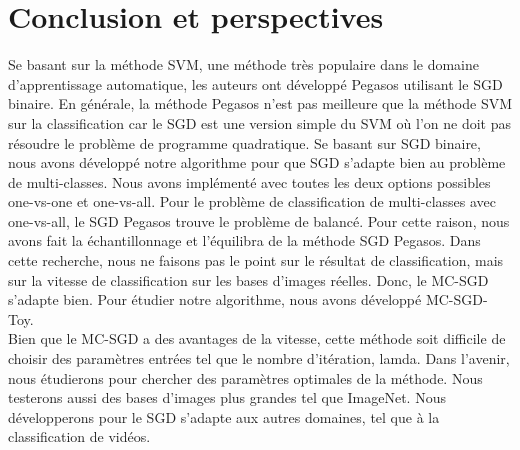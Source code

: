 \chapter*{Conclusion et perspectives}
\label{chap:con}
Se basant sur la méthode SVM, une méthode très populaire dans le domaine d'apprentissage automatique, les auteurs ont développé Pegasos \cite{sss07} utilisant le SGD binaire. En générale, la méthode Pegasos n'est pas meilleure que la méthode SVM sur la classification car le SGD est une version simple du SVM où l'on ne doit pas résoudre le problème de programme quadratique. Se basant sur SGD binaire, nous avons développé notre algorithme pour que SGD s'adapte bien au problème de multi-classes. Nous avons implémenté avec toutes les deux options possibles one-vs-one et one-vs-all. Pour le problème de classification de multi-classes avec one-vs-all, le SGD Pegasos trouve le problème de balancé. Pour cette raison, nous avons fait la échantillonnage et l'équilibra de la méthode SGD Pegasos. Dans cette recherche, nous ne faisons pas le point sur le résultat de classification, mais sur la vitesse de classification sur les bases d'images réelles. Donc, le MC-SGD s'adapte bien. Pour étudier notre algorithme, nous avons développé MC-SGD-Toy.\\

Bien que le MC-SGD a des avantages de la vitesse, cette méthode soit difficile de choisir des paramètres entrées tel que le nombre d'itération, lamda. Dans l'avenir, nous étudierons pour chercher des paramètres optimales de la méthode. Nous testerons aussi des bases d'images plus grandes tel que ImageNet. Nous développerons pour le SGD s'adapte aux autres domaines, tel que à la classification de vidéos.
